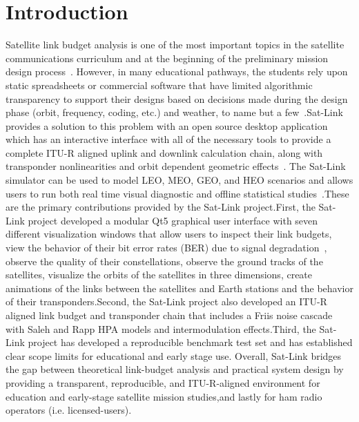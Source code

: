 \documentclass[conference]{IEEEtran}
\begin{document}
\section{Introduction}

Satellite link budget analysis is one of the most important topics in the satellite communications curriculum and at the beginning of the preliminary mission design process~\cite{maral2020,itu_s1328}. However, in many educational pathways, the students rely upon static spreadsheets or commercial software that have limited algorithmic transparency to support their designs based on decisions made during the design phase (orbit, frequency, coding, etc.) and weather, to name but a few~\cite{dvbs2,sklar2001,usman2019_rain}.Sat-Link provides a solution to this problem with an open source desktop application which has an interactive interface with all of the necessary tools to provide a complete ITU-R aligned uplink and downlink calculation chain, along with transponder nonlinearities and orbit dependent geometric effects~\cite{itu_p618,itu_p838,itu_p676,itu_p840,itu_s465,itu_s1528,saleh1981,rapp1991,vallado2013}. The Sat-Link simulator can be used to model LEO, MEO, GEO, and HEO scenarios and allows users to run both real time visual diagnostic and offline statistical studies~\cite{itu_p1623}.These are the primary contributions provided by the Sat-Link project.First, the Sat-Link project developed a modular Qt5 graphical user interface with seven different visualization windows that allow users to inspect their link budgets, view the behavior of their bit error rates (BER) due to signal degradation~\cite{sklar2001,dvbs2}, observe the quality of their constellations, observe the ground tracks of the satellites, visualize the orbits of the satellites in three dimensions, create animations of the links between the satellites and Earth stations and the behavior of their transponders.Second, the Sat-Link project also developed an ITU-R aligned link budget and transponder chain that includes a Friis noise cascade with Saleh and Rapp HPA models and intermodulation effects.Third, the Sat-Link project has developed a reproducible benchmark test set and has established clear scope limits for educational and early stage use.
Overall, Sat-Link bridges the gap between theoretical link-budget analysis and practical system design by providing a transparent, reproducible, and ITU-R-aligned environment for education and early-stage satellite mission studies,and lastly for ham radio operators (i.e. licensed-users).
\end{document}

